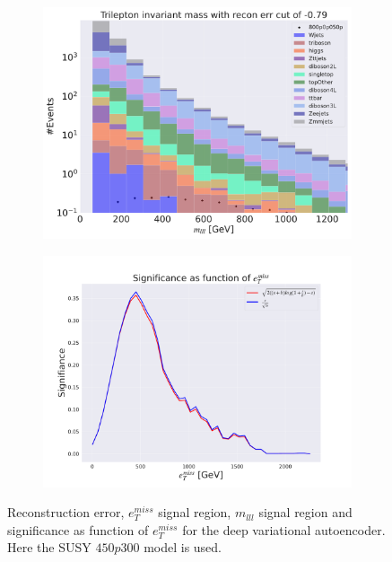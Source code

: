 \begin{figure}[H]
    \hfill
    \begin{subfigure}{.40\textwidth}
        \includegraphics[width=\textwidth]{Figures/VAE_testing/big/3lep/b_data_recon_big_rm3_feats_sig_800p0p050p_mlll_recon_errcut_-0.79.pdf}
        \caption{}
        \label{fig:VAE_3lep_big_mlll_800_2}
    \end{subfigure}
    \hfill   
    \begin{subfigure}{.40\textwidth}
        \includegraphics[width=\textwidth]{Figures/VAE_testing/big/3lep/significance_etmiss_800p0p050p_-0.7941392653620614.pdf}
        \caption{}
        \label{fig:VAE_3lep_big_signi_800_2}
    \end{subfigure}
    \hfill      
    \caption[3lep deep network | $800p50$ | VAE | 2]{Reconstruction error, $e_T^{miss}$ signal region, $m_{lll}$ signal region and significance as function of 
    $e_T^{miss}$ for the deep variational autoencoder. Here the SUSY $450p300$ model is used.}
    \label{fig:VAE_3lep_big_rec_sig_signi_800_2}
\end{figure}

